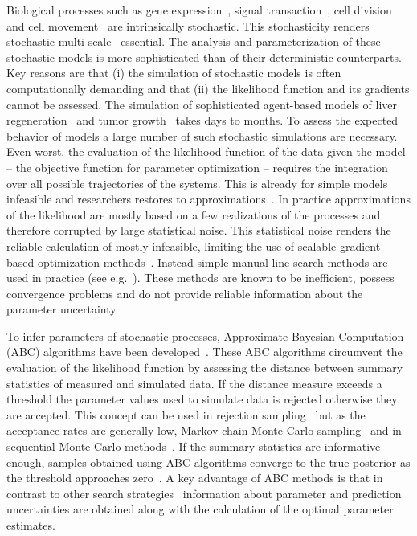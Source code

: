 \documentclass[10pt,letterpaper]{article}
\begin{document}
Biological processes such as gene expression~\cite{ElowitzLev2002,EldarElo2010}, signal transaction~\cite{NiepelSpe2009,KlannLap2009}, cell division~\cite{HuhPau2011} and cell movement~\cite{GranerGlazier1992,AndersonQua2008} are intrinsically stochastic. This stochasticity renders stochastic multi-scale~\cite{DadaMen2011,WalpolePap2013,HasenauerJag2015} essential. The analysis and parameterization of these stochastic models is more sophisticated than of their deterministic counterparts. Key reasons are that (i) the simulation of stochastic models is often computationally demanding and that (ii) the likelihood function and its gradients cannot be assessed. The simulation of sophisticated agent-based models of liver regeneration~\cite{HoehmeBru2010} and tumor growth~\cite{AndersonQua2008,Jagiella2012} takes days to months. To assess the expected behavior of models a large number of such stochastic simulations are necessary. Even worst, the evaluation of the likelihood function of the data given the model -- the objective function for parameter optimization -- requires the integration over all possible trajectories of the systems. This is already for simple models infeasible and researchers restores to approximations~\cite{Dargatz2010}. In practice approximations of the likelihood are mostly based on a few realizations of the processes and therefore corrupted by large statistical noise. This statistical noise renders the reliable calculation of mostly infeasible, limiting the use of scalable gradient-based optimization methods~\cite{RaueSch2013}. Instead simple manual line search methods are used in practice (see e.g.~\cite{KarrSan2012,Jagiella2015}). These methods are known to be inefficient, possess convergence problems and do not provide reliable information about the parameter uncertainty.

To infer parameters of stochastic processes, Approximate Bayesian Computation (ABC) algorithms have been developed~\cite{BeaumontZha2002}. These ABC algorithms circumvent the evaluation of the likelihood function by assessing the distance between summary statistics of measured and simulated data. If the distance measure exceeds a threshold the parameter values used to simulate data is rejected otherwise they are accepted. This concept can be used in rejection sampling~\cite{BeaumontZha2002} but as the acceptance rates are generally low, Markov chain Monte Carlo sampling~\cite{MarjoramMol2003} and in sequential Monte Carlo methods~\cite{SissonFan2007}. If the summary statistics are informative enough, samples obtained using ABC algorithms converge to the true posterior as the threshold approaches zero~\cite{MarinPil2014}. A key advantage of ABC methods is that in contrast to other search strategies~\cite{AdraKir2011,KarrWil2015} information about parameter and prediction uncertainties are obtained along with the calculation of the optimal parameter estimates.
\end{document}
